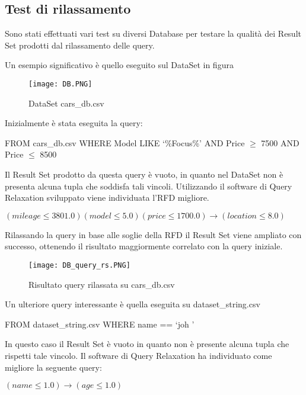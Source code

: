 \subsection{Test di rilassamento}
Sono stati effettuati vari test su diversi Database per testare la qualità dei Result Set prodotti dal rilassamento delle query.

Un esempio significativo è quello eseguito sul DataSet in figura
\begin{figure}[H]
    \centering
    \texttt{[image: DB.PNG]}
    \caption{DataSet cars{\_}db.csv}
    \label{fig:dataset_cars_db}
\end{figure}

Inizialmente è stata eseguita la query:
\begin{center}
FROM cars{\_}db.csv WHERE Model LIKE \lq\%Focus\%\rq
AND Price $\geq$ 7500 AND Price $\leq$ 8500
\end{center}

Il Result Set prodotto da questa query è vuoto, in quanto nel DataSet non è presenta alcuna tupla che soddisfa tali vincoli.
Utilizzando il software di Query Relaxation sviluppato viene individuata l'RFD migliore.
\begin{center}
$(mileage \leq 3801.0) (model \leq 5.0) (price \leq 1700.0) \rightarrow (location \leq 8.0)$
\end{center}

Rilassando la query in base alle soglie della RFD il Result Set viene ampliato con successo, ottenendo il risultato maggiormente correlato con la query iniziale.
\begin{figure}[H]
    \centering
    \texttt{[image: DB\_query\_rs.PNG]}
    \caption{Risultato query rilassata su cars{\_}db.csv}
    \label{fig:rs_query_rx_cars_db}
\end{figure}


Un ulteriore query interessante è quella eseguita su dataset{\_}string.csv
\begin{center}
FROM dataset{\_}string.csv WHERE name == \lq joh \rq
\end{center}

In questo caso il Result Set è vuoto in quanto non è presente alcuna tupla che rispetti tale vincolo.
Il software di Query Relaxation ha individuato come migliore la seguente query:
\begin{center}
    $(name \leq 1.0) \rightarrow (age \leq 1.0)$
\end{center}

